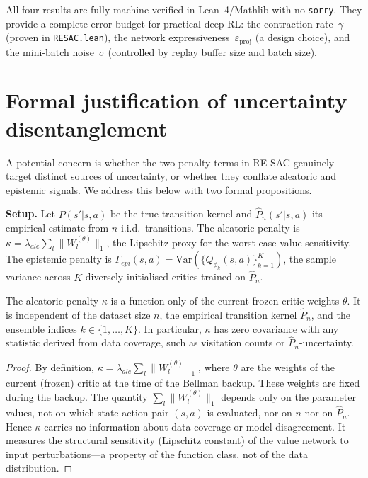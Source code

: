 \noindent All four results are fully machine-verified in Lean~4/Mathlib with no \texttt{sorry}.
They provide a complete error budget for practical deep RL: the contraction rate~$\gamma$ (proven in \texttt{RESAC.lean}), the network expressiveness~$\varepsilon_{\mathrm{proj}}$ (a design choice), and the mini-batch noise~$\sigma$ (controlled by replay buffer size and batch size).


\section{Formal justification of uncertainty disentanglement}
\label{app:disentanglement}

A potential concern is whether the two penalty terms in RE-SAC genuinely
target distinct sources of uncertainty, or whether they conflate aleatoric and
epistemic signals.  We address this below with two formal propositions.

\medskip
\noindent\textbf{Setup.}
Let $P(s'|s,a)$ be the true transition kernel and $\hat{P}_n(s'|s,a)$ its
empirical estimate from $n$ i.i.d.\ transitions.  The aleatoric penalty is
$\kappa = \lambda_{ale}\sum_l\|W_l^{(\theta)}\|_1$, the Lipschitz proxy for the
worst-case value sensitivity.  The epistemic penalty is $\Gamma_{epi}(s,a) =
\mathrm{Var}(\{Q_{\phi_k}(s,a)\}_{k=1}^K)$, the sample variance across $K$
diversely-initialised critics trained on $\hat{P}_n$.

\begin{proposition}
    \label{prop:ale_orth}
    The aleatoric penalty $\kappa$ is a function only of the current frozen critic
    weights $\theta$.  It is independent of the dataset size $n$, the empirical
    transition kernel $\hat{P}_n$, and the ensemble indices $k\in\{1,\dots,K\}$.
    In particular, $\kappa$ has zero covariance with any statistic derived
    from data coverage, such as visitation counts or $\hat{P}_n$-uncertainty.
\end{proposition}
\begin{proof}
    By definition, $\kappa = \lambda_{ale}\sum_l\|W_l^{(\theta)}\|_1$, where
    $\theta$ are the weights of the current (frozen) critic at the time of the
    Bellman backup.  These weights are fixed during the backup.  The quantity
    $\sum_l\|W_l^{(\theta)}\|_1$ depends only on the parameter values, not on
    which state-action pair $(s,a)$ is evaluated, nor on $n$ nor on
    $\hat{P}_n$.  Hence $\kappa$ carries no information about data coverage or
    model disagreement.  It measures the structural sensitivity (Lipschitz
    constant) of the value network to input perturbations---a property of the
    function class, not of the data distribution.
\end{proof}

